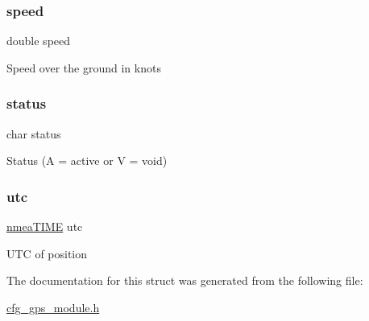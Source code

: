 \subsubsection{\texorpdfstring{speed}{speed}}
{\footnotesize\ttfamily double speed}

Speed over the ground in knots \mbox{\label{struct__nmea_g_p_r_m_c_a051c9e198ee930358372c407a17e8b78}} 
\subsubsection{\texorpdfstring{status}{status}}
{\footnotesize\ttfamily char status}

Status (A = active or V = void) \mbox{\label{struct__nmea_g_p_r_m_c_a3ddf15855460a4cadc548d695ca841dd}} 
\subsubsection{\texorpdfstring{utc}{utc}}
{\footnotesize\ttfamily \hyperlink{cfg__gps__module_8h_a02bf9ae5b3df2ced0b3406a214735cb2}{nmea\+T\+I\+ME} utc}

U\+TC of position 

The documentation for this struct was generated from the following file\+:\begin{DoxyCompactItemize}
\item 
\hyperlink{cfg__gps__module_8h}{cfg\+\_\+gps\+\_\+module.\+h}\end{DoxyCompactItemize}

